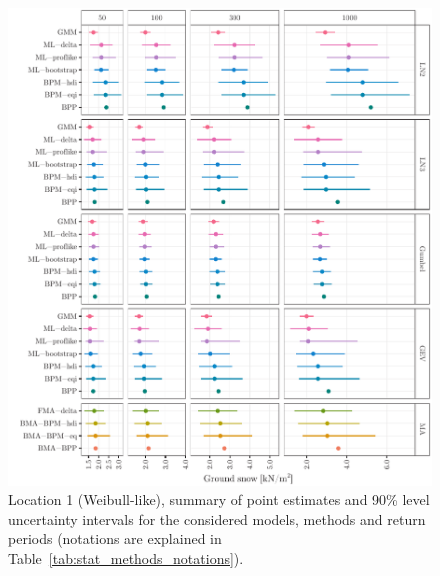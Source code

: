 \begin{figure}[htbp!]
	\centering    
	\includegraphics[]{ID300_full_summary_large.pdf}
	\caption{Location 1 (Weibull-like), summary of point estimates and 90\% level uncertainty intervals for the considered models, methods and return periods (notations are explained in Table~\ref{tab:stat_methods_notations}).}
	\label{fig:loc1_full_summary}
\end{figure}


